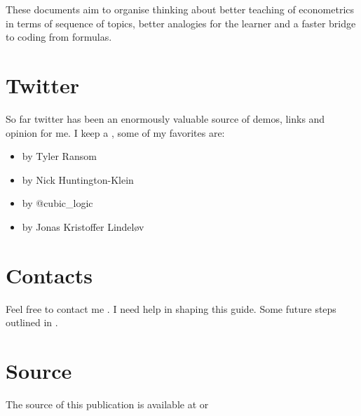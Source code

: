 \documentclass[letterpaper,10pt,english]{sphinxmanual}
\begin{document}
These documents aim to organise thinking about better teaching of
econometrics in terms of sequence of topics, better analogies for the learner and
a faster bridge to coding from formulas.


\section{Twitter}
\label{\detokenize{index:twitter}}
So far twitter has been an enormously valuable source of demos, links and opinion for me.
I keep a , some of my favorites are:
\begin{itemize}
\item {} 
 by Tyler Ransom

\end{itemize}


\begin{itemize}
\item {} 
 by Nick Huntington-Klein

\end{itemize}


\begin{itemize}
\item {} 
 by @cubic\_logic

\end{itemize}


\begin{itemize}
\item {} 
 by Jonas Kristoffer Lindeløv

\end{itemize}




\section{Contacts}
\label{\detokenize{index:contacts}}
Feel free to contact me .
I need help in shaping this guide. Some future steps outlined in
.


\section{Source}
\label{\detokenize{index:source}}
The source of this publication is available at 
or 



\renewcommand{\indexname}{Index}
\printindex
\end{document}

